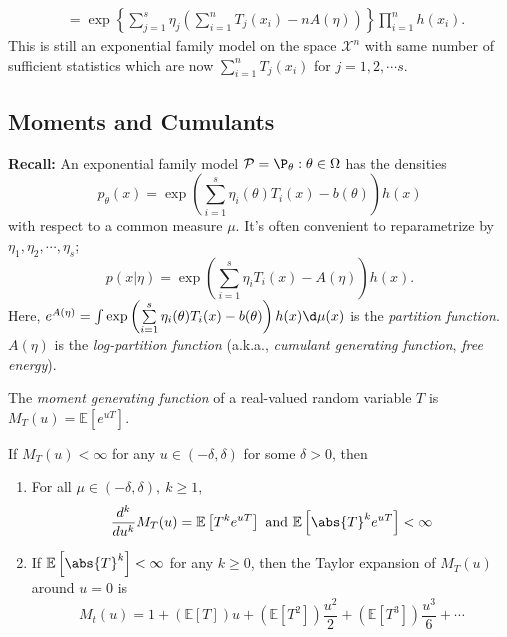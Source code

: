 \documentclass[a4paper]{article}
\begin{document}
\begin{answer}
\begin{enumerate}
\begin{equation}
\begin{aligned}
 				&= \exp\left\{\sum\limits_{j=1}^s \eta_j\left(\sum\limits_{i=1}^n T_j(x_i) - n A(\eta)\right)\right\}\prod\limits_{i = 1}^n h(x_i).
 			\end{aligned}
 		\end{equation}
 		This is still an exponential family model on the space $\mathcal{X}^n$ with same number of sufficient statistics which are now $\sum\limits_{i=1}^n T_j(x_i)$ for $j = 1,2, \cdots s$.
	\end{enumerate}
\end{answer}

\subsection{Moments and Cumulants}
\textbf{Recall:} An exponential family model $\mathcal{P}={\P_\theta:\theta \in \Omega}$ has the densities
\begin{equation*}
	p_{\theta}(x) = \exp\left(\sum\limits_{i=1}^s \eta_i(\theta)T_i(x)-b(\theta)\right)h(x)
\end{equation*}
with respect to a common measure $\mu$. It's often convenient to reparametrize by $\eta_1,\eta_2,\cdots,\eta_s$;
\begin{equation*}
	p(x|\eta) = \exp\left(\sum\limits_{i=1}^s \eta_i T_i(x) - A(\eta)\right) h(x).
\end{equation*}
Here, $e^{A(\eta)} = \int \exp\left(\sum\limits_{i=1}^s \eta_i(\theta)T_i(x)-b(\theta)\right)h(x) \d \mu(x)$ is the \emph{partition function}. $A(\eta)$ is the \emph{log-partition function} (a.k.a., \emph{cumulant generating function}, \emph{free energy}).

\begin{defi}
	The \emph{moment generating function} of a real-valued random variable $T$ is $M_T(u) = \mathbb{E}[e^{u T}]$.
\end{defi}

\begin{prop} If $M_T(u) < \infty$ for any $u \in (-\delta,\delta)$ for some $\delta > 0$, then
	\begin{enumerate}
		\item For all $\mu \in (-\delta,\delta), \ k \geq 1$,
		\begin{equation}
			\frac{d^k}{du^k}M_T(u) = \mathbb{E}\left[T^ke^{uT}\right] \text{ and } \mathbb{E}\left[\abs{T}^ke^{uT}\right] < \infty
		\end{equation}
		\item If $\mathbb{E}\left[\abs{T}^k\right] < \infty$ for any $k \geq 0$, then the Taylor expansion of $M_T(u)$ around $u = 0$ is
		\begin{equation}
			M_t(u) = 1 + \left(\mathbb{E}\left[T\right]\right)u + \left(\mathbb{E}\left[T^2\right]\right)\frac{u^2}{2} + \left(\mathbb{E}\left[T^3\right]\right)\frac{u^3}{6} + \cdots
		\end{equation}
	\end{enumerate}
\end{prop}
\end{document}
